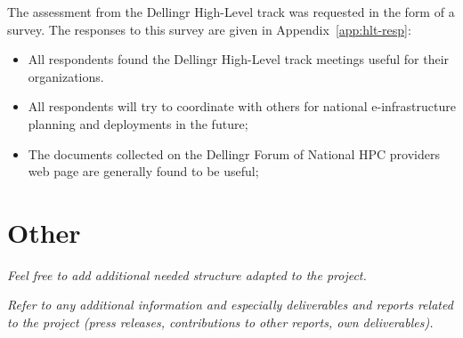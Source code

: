 \documentclass{article}
\newcommand{\dell}{Dellingr\xspace}
\newcommand{\einfra}{e-infrastructure\xspace}
\newcommand{\HLT}{High-Level track\xspace}
\begin{document}
The assessment from the \dell \HLT was requested in the form of a survey.
The responses to this survey are given in Appendix~\ref{app:hlt-resp}:
\begin{itemize}
\item All respondents found the \dell \HLT meetings useful for their organizations.
\item All respondents will try to coordinate with others for national \einfra planning and deployments in the future;
\item The documents collected on the \dell Forum of National HPC providers web page are generally found to be useful;
\end{itemize}

\section{Other}

{\it Feel free to add additional needed structure adapted to the project.}

\newpage
{\it Refer to any additional information and especially deliverables and reports related to the project (press releases, contributions to other reports, own deliverables).}
{}

\end{document}

